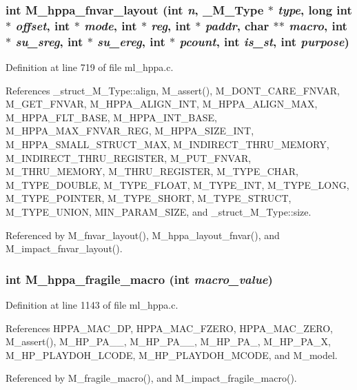 \subsubsection{\setlength{\rightskip}{0pt plus 5cm}int M\_\-hppa\_\-fnvar\_\-layout (int {\em n}, \bf{\_\-M\_\-Type} $\ast$ {\em type}, long int $\ast$ {\em offset}, int $\ast$ {\em mode}, int $\ast$ {\em reg}, int $\ast$ {\em paddr}, char $\ast$$\ast$ {\em macro}, int $\ast$ {\em su\_\-sreg}, int $\ast$ {\em su\_\-ereg}, int $\ast$ {\em pcount}, int {\em is\_\-st}, int {\em purpose})}\label{ml__hppa_8c_c4a83ef7b3974b1cbe2e33c5d38b8b4e}




Definition at line 719 of file ml\_\-hppa.c.

References \_\-struct\_\-M\_\-Type::align, M\_\-assert(), M\_\-DONT\_\-CARE\_\-FNVAR, M\_\-GET\_\-FNVAR, M\_\-HPPA\_\-ALIGN\_\-INT, M\_\-HPPA\_\-ALIGN\_\-MAX, M\_\-HPPA\_\-FLT\_\-BASE, M\_\-HPPA\_\-INT\_\-BASE, M\_\-HPPA\_\-MAX\_\-FNVAR\_\-REG, M\_\-HPPA\_\-SIZE\_\-INT, M\_\-HPPA\_\-SMALL\_\-STRUCT\_\-MAX, M\_\-INDIRECT\_\-THRU\_\-MEMORY, M\_\-INDIRECT\_\-THRU\_\-REGISTER, M\_\-PUT\_\-FNVAR, M\_\-THRU\_\-MEMORY, M\_\-THRU\_\-REGISTER, M\_\-TYPE\_\-CHAR, M\_\-TYPE\_\-DOUBLE, M\_\-TYPE\_\-FLOAT, M\_\-TYPE\_\-INT, M\_\-TYPE\_\-LONG, M\_\-TYPE\_\-POINTER, M\_\-TYPE\_\-SHORT, M\_\-TYPE\_\-STRUCT, M\_\-TYPE\_\-UNION, MIN\_\-PARAM\_\-SIZE, and \_\-struct\_\-M\_\-Type::size.

Referenced by M\_\-fnvar\_\-layout(), M\_\-hppa\_\-layout\_\-fnvar(), and M\_\-impact\_\-fnvar\_\-layout().
\subsubsection{\setlength{\rightskip}{0pt plus 5cm}int M\_\-hppa\_\-fragile\_\-macro (int {\em macro\_\-value})}\label{ml__hppa_8c_3014f9b711fa96e603622a27d431a97a}




Definition at line 1143 of file ml\_\-hppa.c.

References HPPA\_\-MAC\_\-DP, HPPA\_\-MAC\_\-FZERO, HPPA\_\-MAC\_\-ZERO, M\_\-assert(), M\_\-HP\_\-PA\_\_, M\_\-HP\_\-PA\_\_, M\_\-HP\_\-PA\_, M\_\-HP\_\-PA\_\-X, M\_\-HP\_\-PLAYDOH\_\-LCODE, M\_\-HP\_\-PLAYDOH\_\-MCODE, and M\_\-model.

Referenced by M\_\-fragile\_\-macro(), and M\_\-impact\_\-fragile\_\-macro().
